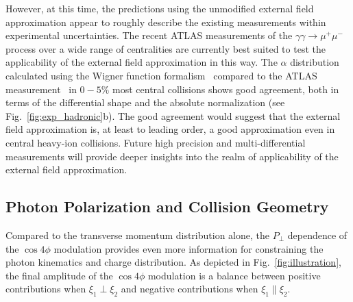 \documentclass[twocolumn,epjc3]{svjour3}\sloppy
\begin{document}
However, at this time, the predictions using the unmodified external field approximation appear to roughly describe the existing measurements within experimental uncertainties. The recent ATLAS measurements of the $\gamma\gamma \rightarrow \mu^+\mu^-$ process over a wide range of centralities are currently best suited to test the applicability of the external field approximation in this way. The $\alpha$ distribution calculated using the Wigner function formalism~\cite{klusek-gawendaCentralityDependenceDilepton2021} compared to the ATLAS measurement~\cite{atlascollaborationObservationCentralityDependentAcoplanarity2018a} in $0-5\%$ most central collisions shows good agreement, both in terms of the differential shape and the absolute normalization (see Fig.~\ref{fig:exp_hadronic}b). The good agreement would suggest that the external field approximation is, at least to leading order, a good approximation even in central heavy-ion collisions. Future high precision and multi-differential measurements will provide deeper insights into the realm of applicability of the external field approximation.

\subsection{Photon Polarization and Collision Geometry}
Compared to the transverse momentum distribution alone, the $P_\perp$ dependence of the $\cos4\phi$ modulation provides even more information for constraining the photon kinematics and charge distribution. As depicted in Fig.~\ref{fig:illustration}, the final amplitude of the $\cos4\phi$ modulation is a balance between positive contributions when $\xi_1 \perp \xi_2$ and negative contributions when $\xi_1 \parallel \xi_2$. 
\end{document}
